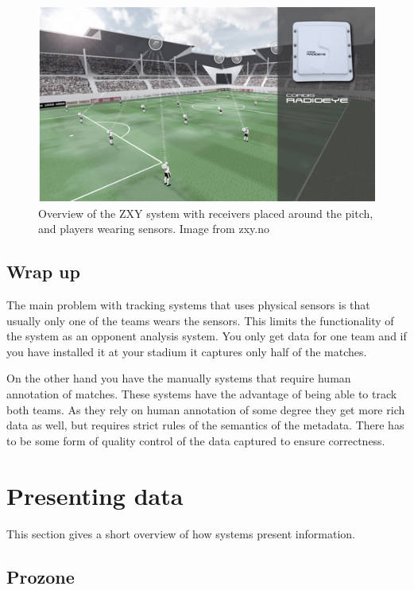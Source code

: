 \begin{figure}[ht!]
\centering
\includegraphics[width=1\textwidth]{images/general/zxyoverview.png}
\caption{Overview of the ZXY system with receivers placed around the pitch, and players wearing sensors. Image from zxy.no}
\label{fig:zxycam}
\end{figure}

\subsection{Wrap up}
The main problem with tracking systems that uses physical sensors is that usually only one of the teams wears the sensors. This limits the functionality of the system as an opponent analysis system. You only get data for one team and if you have installed it at your stadium it captures only half of the matches. 

On the other hand you have the manually systems that require human annotation of matches. These systems have the advantage of being able to track both teams. As they rely on human annotation of some degree they get more rich data as well, but requires strict rules of the semantics of the metadata. There has to be some form of quality control of the data captured to ensure correctness.

\section{Presenting data}

This section gives a short overview of how systems present information.

\subsection{Prozone}

